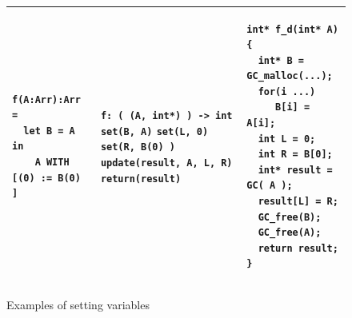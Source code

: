 \documentclass[12pt,a4paper,titlepage]{article}
\newcommand{\cl}[1]{\texttt{#1}}
\begin{document}
\begin{figure}[h!]
\begin{tabular}{|p{5.2cm}|p{5.8cm}|p{6cm}|}
\begin{lstlisting}
f(A:Arr):Arr =
  let B = A in
    A WITH [(0) := B(0) ]
\end{lstlisting} &
\cl{f: ( (A, int*) ) -> int} \newline
\cl{set(B, A)} \newline
\cl{set(L, 0)} \newline
\cl{set(R, B(0) )} \newline
\cl{update(result, A, L, R)} \newline
\cl{return(result)} &
\begin{lstlisting}
int* f_d(int* A) {
  int* B = GC_malloc(...);
  for(i ...)
     B[i] = A[i];
  int L = 0;
  int R = B[0];
  int* result = GC( A );
  result[L] = R;
  GC_free(B);
  GC_free(A);
  return result;
}
\end{lstlisting} \\ \hline
\end{tabular}
\caption{Examples of setting variables}
\end{figure}
\end{document}
